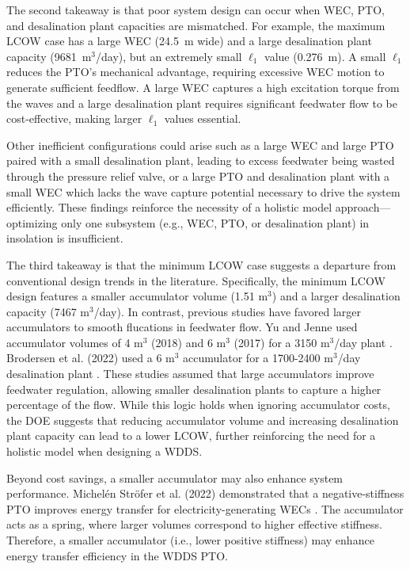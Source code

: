 \documentclass[twocolumn,10pt]{asme2e}
\begin{document}
The second takeaway is that poor system design can occur when WEC, PTO, and desalination plant capacities are mismatched. For example, the maximum LCOW case has a large WEC (24.5~m wide) and a large desalination plant capacity (9681~m$^3$/day), but an extremely small $\ell_1$ value (0.276~m). A small $\ell_1$ reduces the PTO's mechanical advantage, requiring excessive WEC motion to generate sufficient feedflow. A large WEC captures a high excitation torque from the waves and a large desalination plant requires significant feedwater flow to be cost-effective, making larger $\ell_1$ values essential. 

Other inefficient configurations could arise such as a large WEC and large PTO paired with a small desalination plant, leading to excess feedwater being wasted through the pressure relief valve, or a large PTO and desalination plant with a small WEC which lacks the wave capture potential necessary to drive the system efficiently. These findings reinforce the necessity of a holistic model approach---optimizing only one subsystem (e.g., WEC, PTO, or desalination plant) in insolation is insufficient.

The third takeaway is that the minimum LCOW case suggests a departure from conventional design trends in the literature. Specifically, the minimum LCOW design features a smaller accumulator volume (1.51 m$^3$) and a larger desalination capacity (7467 m$^3$/day). In contrast, previous studies have favored larger accumulators to smooth flucations in feedwater flow. Yu and Jenne used accumulator volumes of 4 m$^3$ (2018) and 6 m$^3$ (2017) for a 3150 m$^3$/day plant \cite{YJecon2017,Yu2018}. Brodersen et al. (2022) used a 6 m$^3$ accumulator for a 1700-2400 m$^3$/day desalination plant \cite{Brodersen2022}. These studies assumed that large accumulators improve feedwater regulation, allowing smaller desalination plants to capture a higher percentage of the flow. While this logic holds when ignoring accumulator costs, the DOE suggests that reducing accumulator volume and increasing desalination plant capacity can lead to a lower LCOW, further reinforcing the need for a holistic model when designing a WDDS.

Beyond cost savings, a smaller accumulator may also enhance system performance. Michelén Ströfer et al. (2022) demonstrated that a negative-stiffness PTO improves energy transfer for electricity-generating WECs  \cite{Stroefer2023}. The accumulator acts as a spring, where larger volumes correspond to higher effective stiffness. Therefore, a smaller accumulator (i.e., lower positive stiffness) may enhance energy transfer efficiency in the WDDS PTO.
\end{document}
